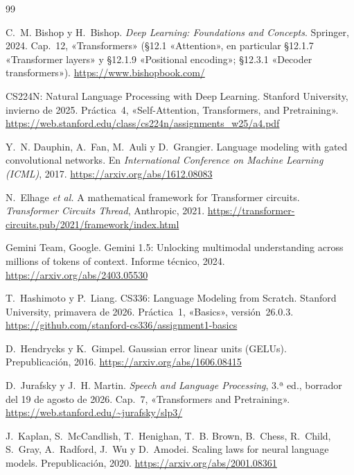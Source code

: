 \begin{thebibliography}{99}
\small
\def\UrlBreaks{\do\/\do-}

C.~M. Bishop y H.~Bishop.
\newblock \emph{Deep Learning: Foundations and Concepts}.
\newblock Springer, 2024.
\newblock Cap.~12, «Transformers» (§12.1 «Attention», en particular §12.1.7 «Transformer layers» y §12.1.9 «Positional encoding»; §12.3.1 «Decoder transformers»).
\newblock \url{https://www.bishopbook.com/}

CS224N: Natural Language Processing with Deep Learning.
\newblock Stanford University, invierno de 2025. Práctica~4, «Self-Attention, Transformers, and Pretraining».
\newblock \url{https://web.stanford.edu/class/cs224n/assignments_w25/a4.pdf}

Y.~N. Dauphin, A.~Fan, M.~Auli y D.~Grangier.
\newblock Language modeling with gated convolutional networks.
\newblock En \emph{International Conference on Machine Learning (ICML)}, 2017.
\newblock \url{https://arxiv.org/abs/1612.08083}

N.~Elhage \emph{et al.}
\newblock A mathematical framework for Transformer circuits.
\newblock \emph{Transformer Circuits Thread}, Anthropic, 2021.
\newblock \url{https://transformer-circuits.pub/2021/framework/index.html}

Gemini Team, Google.
\newblock Gemini 1.5: Unlocking multimodal understanding across millions of tokens of context.
\newblock Informe técnico, 2024.
\newblock \url{https://arxiv.org/abs/2403.05530}

T.~Hashimoto y P.~Liang.
\newblock CS336: Language Modeling from Scratch.
\newblock Stanford University, primavera de 2026. Práctica~1, «Basics», versión~26.0.3.
\newblock \url{https://github.com/stanford-cs336/assignment1-basics}

D.~Hendrycks y K.~Gimpel.
\newblock Gaussian error linear units (GELUs).
\newblock Prepublicación, 2016.
\newblock \url{https://arxiv.org/abs/1606.08415}

D.~Jurafsky y J.~H. Martin.
\newblock \emph{Speech and Language Processing}, 3.ª ed., borrador del 19 de agosto de 2026.
\newblock Cap.~7, «Transformers and Pretraining».
\newblock \url{https://web.stanford.edu/~jurafsky/slp3/}

J.~Kaplan, S.~McCandlish, T.~Henighan, T.~B. Brown, B.~Chess, R.~Child, S.~Gray, A.~Radford, J.~Wu y D.~Amodei.
\newblock Scaling laws for neural language models.
\newblock Prepublicación, 2020.
\newblock \url{https://arxiv.org/abs/2001.08361}


\end{thebibliography}
